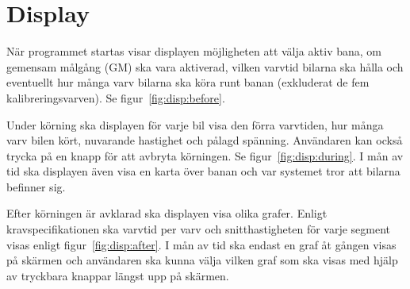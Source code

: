 \section{Display}

När programmet startas visar displayen möjligheten att välja aktiv bana, om
gemensam målgång (GM) ska vara aktiverad, vilken varvtid bilarna ska hålla och
eventuellt hur många varv bilarna ska köra runt banan (exkluderat de fem
kalibreringsvarven). Se figur~\ref{fig:disp:before}.

Under körning ska displayen för varje bil visa den förra varvtiden, hur många
varv bilen kört, nuvarande hastighet och pålagd spänning. Användaren kan också
trycka på en knapp för att avbryta körningen. Se figur~\ref{fig:disp:during}. I
mån av tid ska displayen även visa en karta över banan och var systemet tror
att bilarna befinner sig.

Efter körningen är avklarad ska displayen visa olika grafer. Enligt
kravspecifikationen ska varvtid per varv och snitthastigheten för varje segment
visas enligt figur~\ref{fig:disp:after}. I mån av tid ska endast en graf åt
gången visas på skärmen och användaren ska kunna välja vilken graf som ska
visas med hjälp av tryckbara knappar längst upp på skärmen.

